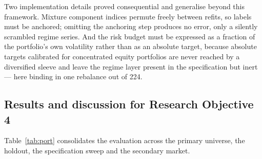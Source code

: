 Two implementation details proved consequential and generalise beyond this framework. Mixture
component indices permute freely between refits, so labels must be anchored; omitting the
anchoring step produces no error, only a silently scrambled regime series. And the risk budget
must be expressed as a fraction of the portfolio's own volatility rather than as an absolute
target, because absolute targets calibrated for concentrated equity portfolios are never reached
by a diversified sleeve and leave the regime layer present in the specification but inert ---
here binding in one rebalance out of 224.

\subsection{Results and discussion for Research Objective 4}

Table~\ref{tab:port} consolidates the evaluation across the primary universe, the holdout, the
specification sweep and the secondary market.

